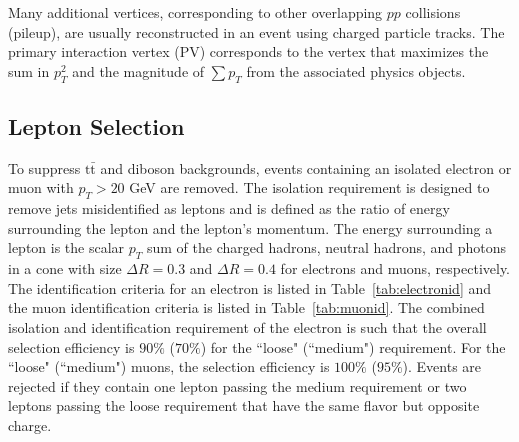 \noindent
Many additional vertices, corresponding to other overlapping $pp$ collisions (pileup), are usually reconstructed in an event using charged particle tracks. The primary interaction vertex (PV) corresponds to the vertex that maximizes the sum in $p_{T}^2$ and the magnitude of $\sum{p_{T}}$ from the associated physics objects.

\subsection{Lepton Selection}

To suppress $\mathrm{t\bar{t}}$ and diboson backgrounds, events containing an isolated electron or muon with $p_{T} > 20$ GeV are removed. The isolation requirement is designed to remove jets misidentified as leptons and is defined as the ratio of energy surrounding the lepton and the lepton's momentum. The energy surrounding a lepton is the scalar $p_{T}$ sum of the charged hadrons, neutral hadrons, and photons in a cone with size $\Delta R = 0.3$ and $\Delta R = 0.4$ for electrons and muons, respectively. The identification criteria for an electron is listed in Table~\ref{tab:electronid} and the muon identification criteria is listed in Table~\ref{tab:muonid}. The combined isolation and identification requirement of the electron is such that the overall selection efficiency is $90\%$ ($70\%$) for the ``loose" (``medium") requirement. For the ``loose" (``medium") muons, the selection efficiency is $100\%$ ($95\%$). Events are rejected if they contain one lepton passing the medium requirement or two leptons passing the loose requirement that have the same flavor but opposite charge.

